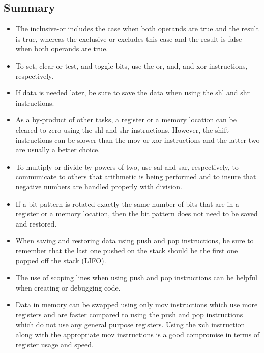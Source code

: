 \documentclass[10pt]{book}
\begin{document}
\subsection{Summary}
\begin{itemize}
  \item The inclusive-or includes the case when both operands are true and the result is true, whereas the exclusive-or excludes this case and the result is false when both operands are true.
  \item To set, clear or test, and toggle bits, use the or, and, and xor instructions, respectively.
  \item If data is needed later, be sure to save the data when using the shl and shr instructions.
  \item As a by-product of other tasks, a register or a memory location can be cleared to zero using the shl and shr instructions. However, the shift instructions can be slower than the mov or xor instructions and the latter two are usually a better choice.
  \item To multiply or divide by powers of two, use sal and sar, respectively, to communicate to others that arithmetic is being performed and to insure that negative numbers are handled properly with division.
  \item If a bit pattern is rotated exactly the same number of bits that are in a register or a memory location, then the bit pattern does not need to be saved and restored.
  \item When saving and restoring data using push and pop instructions, be sure to remember that the last one pushed on the stack should be the first one popped off the stack (LIFO).
  \item The use of scoping lines when using push and pop instructions can be helpful when creating or debugging code.
  \item Data in memory can be swapped using only mov instructions which use more registers and are faster compared to using the push and pop instructions which do not use any general purpose registers. Using the xch instruction along with the appropriate mov instructions is a good compromise in terms of register usage and speed.
\end{itemize}
\end{document}
